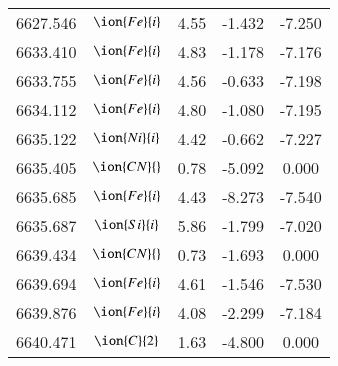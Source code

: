 \documentclass[fleqn,usenatbib]{mnras}
\begin{document}
\begin{center}
\begin{table}
\begin{tabular}{ccccc}
6627.546 &  $\ion{Fe}{i}$  & 4.55 & -1.432 & -7.250 \\ 
6633.410 &  $\ion{Fe}{i}$  & 4.83 & -1.178 & -7.176 \\ 
6633.755 &  $\ion{Fe}{i}$  & 4.56 & -0.633 & -7.198 \\ 
6634.112 &  $\ion{Fe}{i}$  & 4.80 & -1.080 & -7.195 \\ 
6635.122 &  $\ion{Ni}{i}$  & 4.42 & -0.662 & -7.227 \\ 
6635.405 & $\ion{CN}{}$ & 0.78 & -5.092 & 0.000 \\ 
6635.685 &  $\ion{Fe}{i}$  & 4.43 & -8.273 & -7.540 \\ 
6635.687 &  $\ion{Si}{i}$  & 5.86 & -1.799 & -7.020 \\ 
6639.434 & $\ion{CN}{}$ & 0.73 & -1.693 & 0.000 \\ 
6639.694 &  $\ion{Fe}{i}$  & 4.61 & -1.546 & -7.530 \\ 
6639.876 &  $\ion{Fe}{i}$  & 4.08 & -2.299 & -7.184 \\ 
6640.471 &  $\ion{C}{2}$ & 1.63 & -4.800 & 0.000 
 \end{tabular}
 \end{table}
 \end{center}
\end{document}
